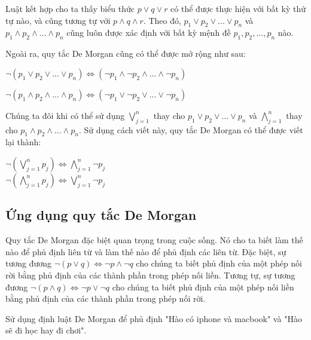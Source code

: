 \documentclass{standalone} %
\begin{document}
        Luật kết hợp cho ta thấy biểu thức $p \lor q \lor r$ có thể được thực hiện với bất kỳ thứ tự nào, và cũng tương tự với $p \land q \land r$. Theo đó, $p_1 \lor p_2 \lor ... \lor p_n$ và $p_1 \land p_2 \land ... \land p_n$ cũng luôn được xác định với bất kỳ mệnh đề $p_1, p_2, ..., p_n$ nào.
        
        Ngoài ra, quy tắc De Morgan cũng có thể được mở rộng như sau:\\
        \begin{center}
            $\neg (p_1 \lor p_2 \lor ... \lor p_n) \Leftrightarrow (\neg p_1 \land \neg p_2 \land ... \land \neg p_n)$
            
            $\neg (p_1 \land p_2 \land ... \land p_n) \Leftrightarrow (\neg p_1 \lor \neg p_2 \lor ... \lor \neg p_n)$
        \end{center}
        
        Chúng ta đôi khi có thể sử dụng $\bigvee_{j=1}^{n}$ thay cho $p_1 \lor p_2 \lor ... \lor p_n$ và $\bigwedge_{j=1}^{n}$ thay cho $p_1 \land p_2 \land ... \land p_n$. Sử dụng cách viết này, quy tắc De Morgan có thể được viết lại thành: 
        \begin{center}
            $\neg (\bigvee_{j = 1}^{n} p_j) \Leftrightarrow \bigwedge_{j=1}^{n} \neg p_j$\\
            $\neg (\bigwedge_{j = 1}^{n} p_j) \Leftrightarrow \bigvee_{j=1}^{n} \neg p_j$
        \end{center}
        
    \subsection{Ứng dụng quy tắc De Morgan}
    
        Quy tắc De Morgan đặc biệt quan trọng trong cuộc sống. Nó cho ta biết làm thế nào để phủ định liên từ và làm thế nào để phủ định các liên từ. Đặc biệt, sự tương đương $\neg (p \lor q) \Leftrightarrow \neg p \land \neg q$ cho chúng ta biết phủ định của một phép nối rời bằng phủ định của các thành phần trong phép nối liền. Tương tự, sự tương đương $\neg (p \land q) \Leftrightarrow \neg p \lor \neg q$ cho chúng ta biết phủ định của một phép nối liền bằng phủ định của các thành phần trong phép nối rời.
        
        \begin{example}
            Sử dụng định luật De Morgan để phủ định "Hào có iphone và macbook" và "Hào sẽ đi học hay đi chơi".
        \end{example}
        
\end{document}

